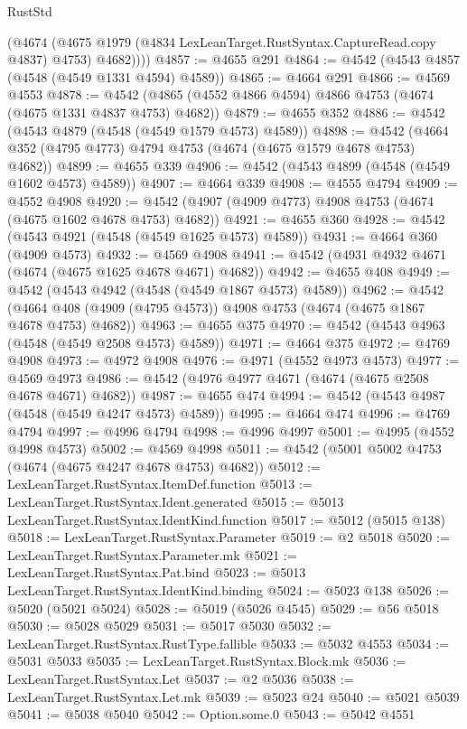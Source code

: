 \begin{lexlean}{RustStd}
\begin{coremodule}
          (@4674
            (@4675 @1979 (@4834 LexLeanTarget.RustSyntax.CaptureRead.copy @4837) @4753)
            @4682))))
@4857 := @4655 @291
@4864 := @4542 (@4543 @4857 (@4548 (@4549 @1331 @4594) @4589))
@4865 := @4664 @291
@4866 := @4569 @4553
@4878 := @4542 (@4865 (@4552 @4866 @4594) @4866 @4753 (@4674 (@4675 @1331 @4837 @4753) @4682))
@4879 := @4655 @352
@4886 := @4542 (@4543 @4879 (@4548 (@4549 @1579 @4573) @4589))
@4898 := @4542 (@4664 @352 (@4795 @4773) @4794 @4753 (@4674 (@4675 @1579 @4678 @4753) @4682))
@4899 := @4655 @339
@4906 := @4542 (@4543 @4899 (@4548 (@4549 @1602 @4573) @4589))
@4907 := @4664 @339
@4908 := @4555 @4794
@4909 := @4552 @4908
@4920 := @4542 (@4907 (@4909 @4773) @4908 @4753 (@4674 (@4675 @1602 @4678 @4753) @4682))
@4921 := @4655 @360
@4928 := @4542 (@4543 @4921 (@4548 (@4549 @1625 @4573) @4589))
@4931 := @4664 @360 (@4909 @4573)
@4932 := @4569 @4908
@4941 := @4542 (@4931 @4932 @4671 (@4674 (@4675 @1625 @4678 @4671) @4682))
@4942 := @4655 @408
@4949 := @4542 (@4543 @4942 (@4548 (@4549 @1867 @4573) @4589))
@4962 := @4542
    (@4664 @408 (@4909 (@4795 @4573)) @4908 @4753 (@4674 (@4675 @1867 @4678 @4753) @4682))
@4963 := @4655 @375
@4970 := @4542 (@4543 @4963 (@4548 (@4549 @2508 @4573) @4589))
@4971 := @4664 @375
@4972 := @4769 @4908
@4973 := @4972 @4908
@4976 := @4971 (@4552 @4973 @4573)
@4977 := @4569 @4973
@4986 := @4542 (@4976 @4977 @4671 (@4674 (@4675 @2508 @4678 @4671) @4682))
@4987 := @4655 @474
@4994 := @4542 (@4543 @4987 (@4548 (@4549 @4247 @4573) @4589))
@4995 := @4664 @474
@4996 := @4769 @4794
@4997 := @4996 @4794
@4998 := @4996 @4997
@5001 := @4995 (@4552 @4998 @4573)
@5002 := @4569 @4998
@5011 := @4542 (@5001 @5002 @4753 (@4674 (@4675 @4247 @4678 @4753) @4682))
@5012 := LexLeanTarget.RustSyntax.ItemDef.function
@5013 := LexLeanTarget.RustSyntax.Ident.generated
@5015 := @5013 LexLeanTarget.RustSyntax.IdentKind.function
@5017 := @5012 (@5015 @138)
@5018 := LexLeanTarget.RustSyntax.Parameter
@5019 := @2 @5018
@5020 := LexLeanTarget.RustSyntax.Parameter.mk
@5021 := LexLeanTarget.RustSyntax.Pat.bind
@5023 := @5013 LexLeanTarget.RustSyntax.IdentKind.binding
@5024 := @5023 @138
@5026 := @5020 (@5021 @5024)
@5028 := @5019 (@5026 @4545)
@5029 := @56 @5018
@5030 := @5028 @5029
@5031 := @5017 @5030
@5032 := LexLeanTarget.RustSyntax.RustType.fallible
@5033 := @5032 @4553
@5034 := @5031 @5033
@5035 := LexLeanTarget.RustSyntax.Block.mk
@5036 := LexLeanTarget.RustSyntax.Let
@5037 := @2 @5036
@5038 := LexLeanTarget.RustSyntax.Let.mk
@5039 := @5023 @24
@5040 := @5021 @5039
@5041 := @5038 @5040
@5042 := Option.some.{0}
@5043 := @5042 @4551

\end{coremodule}
\end{lexlean}
